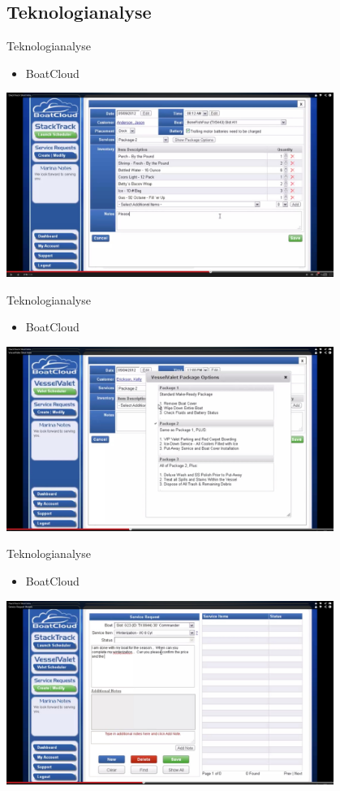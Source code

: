 \subsection{Teknologianalyse}
\begin{frame}{Teknologianalyse}
  \begin{itemize}
    \item BoatCloud
  \end{itemize}
        \includegraphics[width=0.8\textwidth]{images/StackTrack.jpg}
\end{frame}

\begin{frame}{Teknologianalyse}
  \begin{itemize}
    \item BoatCloud
  \end{itemize}
        \includegraphics[width=0.8\textwidth]{images/VesselValet.jpg}  
\end{frame}

\begin{frame}{Teknologianalyse}
  \begin{itemize}
    \item BoatCloud
  \end{itemize}
        \includegraphics[width=0.8\textwidth]{images/TicketTracker.jpg} 
\end{frame}

